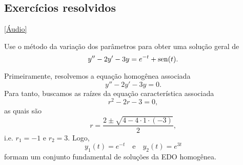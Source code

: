 \subsection*{Exercícios resolvidos}

\begin{flushright}
  [Vídeo]\href{https://archive.org/details/er-s-3-3}{[Áudio]}
\end{flushright}


\begin{exeresol}\label{exeresol:ed2o_nh_vp}
  Use o método da variação dos parâmetros para obter uma solução geral de
  \begin{equation}
    y'' - 2y' - 3y = e^{-t}+\operatorname{sen}(t).
  \end{equation}
\end{exeresol}
\begin{resol}
  Primeiramente, resolvemos a equação homogênea associada
  \begin{equation}
    y'' - 2y' - 3y = 0.
  \end{equation}
  Para tanto, buscamos as raízes da equação característica associada
  \begin{equation}
    r^2 - 2r - 3 = 0,
  \end{equation}
  as quais são
  \begin{equation}
    r = \frac{2 \pm \sqrt{4 - 4\cdot 1\cdot (-3)}}{2},
  \end{equation}
  i.e. $r_1 = -1$ e $r_2 = 3$. Logo,
  \begin{equation}
    y_1(t) = e^{-t}\quad\text{e}\quad y_2(t) = e^{3t}
  \end{equation}
  formam um conjunto fundamental de soluções da EDO homogênea.


\end{resol}
